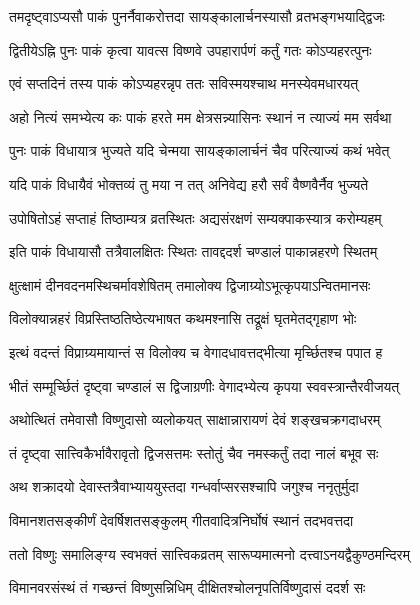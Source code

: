 \twolineshloka
{तमदृष्ट्वाऽप्यसौ पाकं पुनर्नैवाकरोत्तदा}
{सायङ्कालार्चनस्यासौ व्रतभङ्गभयाद्द्विजः} %

\twolineshloka
{द्वितीयेऽह्नि पुनः पाकं कृत्वा यावत्स विष्णवे}
{उपहारार्पणं कर्तुं गतः कोऽप्यहरत्पुनः} %

\twolineshloka
{एवं सप्तदिनं तस्य पाकं कोऽप्यहरन्नृप}
{ततः सविस्मयश्चाथ मनस्येवमधारयत्} %

\twolineshloka
{अहो नित्यं समभ्येत्य कः पाकं हरते मम}
{क्षेत्रसन्न्यासिनः स्थानं न त्याज्यं मम सर्वथा} %

\twolineshloka
{पुनः पाकं विधायात्र भुज्यते यदि चेन्मया}
{सायङ्कालार्चनं चैव परित्याज्यं कथं भवेत्} %

\twolineshloka
{यदि पाकं विधायैवं भोक्तव्यं तु मया न तत्}
{अनिवेद्य हरौ सर्वं वैष्णवैर्नैव भुज्यते} %

\twolineshloka
{उपोषितोऽहं सप्ताहं तिष्ठाम्यत्र व्रतस्थितः}
{अद्यसंरक्षणं सम्यक्पाकस्यात्र करोम्यहम्} %

\twolineshloka
{इति पाकं विधायासौ तत्रैवालक्षितः स्थितः}
{तावद्ददर्श चण्डालं पाकान्नहरणे स्थितम्} %

\twolineshloka
{क्षुत्क्षामं दीनवदनमस्थिचर्मावशेषितम्}
{तमालोक्य द्विजाग्र्योऽभूत्कृपयाऽन्वितमानसः} %

\twolineshloka
{विलोक्यान्नहरं विप्रस्तिष्ठतिष्ठेत्यभाषत}
{कथमश्नासि तद्रूक्षं घृतमेतद्गृहाण भोः} %

\twolineshloka
{इत्थं वदन्तं विप्राग्र्यमायान्तं स विलोक्य च}
{वेगादधावत्तद्भीत्या मृर्च्छितश्च पपात ह} %

\twolineshloka
{भीतं सम्मूर्च्छितं दृष्ट्वा चण्डालं स द्विजाग्रणीः}
{वेगादभ्येत्य कृपया स्ववस्त्रान्तैरवीजयत्} %

\twolineshloka
{अथोत्थितं तमेवासौ विष्णुदासो व्यलोकयत्}
{साक्षान्नारायणं देवं शङ्खचक्रगदाधरम्} %

\twolineshloka
{तं दृष्ट्वा सात्त्विकैर्भावैरावृतो द्विजसत्तमः}
{स्तोतुं चैव नमस्कर्तुं तदा नालं बभूव सः} %

\twolineshloka
{अथ शक्रादयो देवास्तत्रैवाभ्याययुस्तदा}
{गन्धर्वाप्सरसश्चापि जगुश्च ननृतुर्मुदा} %

\twolineshloka
{विमानशतसङ्कीर्णं देवर्षिशतसङ्कुलम्}
{गीतवादित्रनिर्घोषं स्थानं तदभवत्तदा} %

\twolineshloka
{ततो विष्णुः समालिङ्ग्य स्वभक्तं सात्त्विकव्रतम्}
{सारूप्यमात्मनो दत्त्वाऽनयद्वैकुण्ठमन्दिरम्} %

\twolineshloka
{विमानवरसंस्थं तं गच्छन्तं विष्णुसन्निधिम्}
{दीक्षितश्चोलनृपतिर्विष्णुदासं ददर्श सः} %

